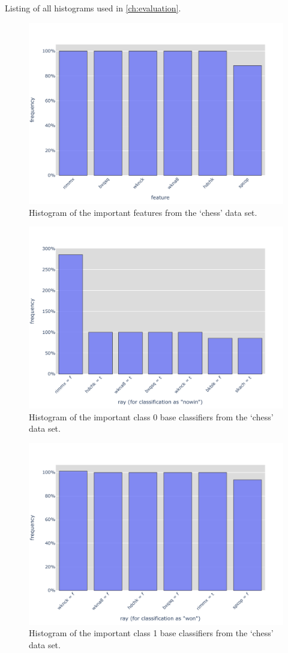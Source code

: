 Listing of all histograms used in \autoref{ch:evaluation}.

\begin{figure}[H]
    \centering
    \includegraphics[width=0.8\columnwidth]{figures/chess/featureHistogram.pdf}
    \caption{Histogram of the important features from the `chess' data set.}\label{fig:histChessF}
\end{figure}
\begin{figure}[H]
    \centering
    \includegraphics[width=0.8\columnwidth]{figures/chess/raysClass0Histogram.pdf}
    \caption{Histogram of the important class 0 base classifiers from the `chess' data set.}\label{fig:histChessR0}
\end{figure}
\begin{figure}[H]
    \centering
    \includegraphics[width=0.9\columnwidth]{figures/chess/raysClass1Histogram.pdf}
    \caption{Histogram of the important class 1 base classifiers from the `chess' data set.}\label{fig:histChessR1}
\end{figure}

